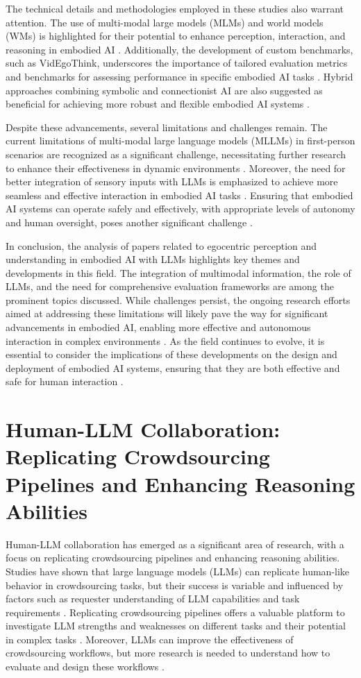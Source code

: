 \documentclass[conference]{IEEEtran}
\begin{document}
The technical details and methodologies employed in these studies also warrant attention. The use of multi-modal large models (MLMs) and world models (WMs) is highlighted for their potential to enhance perception, interaction, and reasoning in embodied AI \cite{b7}. Additionally, the development of custom benchmarks, such as VidEgoThink, underscores the importance of tailored evaluation metrics and benchmarks for assessing performance in specific embodied AI tasks \cite{b3}. Hybrid approaches combining symbolic and connectionist AI are also suggested as beneficial for achieving more robust and flexible embodied AI systems \cite{b8}.

Despite these advancements, several limitations and challenges remain. The current limitations of multi-modal large language models (MLLMs) in first-person scenarios are recognized as a significant challenge, necessitating further research to enhance their effectiveness in dynamic environments \cite{b9}. Moreover, the need for better integration of sensory inputs with LLMs is emphasized to achieve more seamless and effective interaction in embodied AI tasks \cite{b10}. Ensuring that embodied AI systems can operate safely and effectively, with appropriate levels of autonomy and human oversight, poses another significant challenge \cite{b11}.

In conclusion, the analysis of papers related to egocentric perception and understanding in embodied AI with LLMs highlights key themes and developments in this field. The integration of multimodal information, the role of LLMs, and the need for comprehensive evaluation frameworks are among the prominent topics discussed. While challenges persist, the ongoing research efforts aimed at addressing these limitations will likely pave the way for significant advancements in embodied AI, enabling more effective and autonomous interaction in complex environments \cite{b12}. As the field continues to evolve, it is essential to consider the implications of these developments on the design and deployment of embodied AI systems, ensuring that they are both effective and safe for human interaction \cite{b13}.

\section{Human-LLM Collaboration: Replicating Crowdsourcing Pipelines and Enhancing Reasoning Abilities}
Human-LLM collaboration has emerged as a significant area of research, with a focus on replicating crowdsourcing pipelines and enhancing reasoning abilities. Studies have shown that large language models (LLMs) can replicate human-like behavior in crowdsourcing tasks, but their success is variable and influenced by factors such as requester understanding of LLM capabilities and task requirements \cite{b1}. Replicating crowdsourcing pipelines offers a valuable platform to investigate LLM strengths and weaknesses on different tasks and their potential in complex tasks \cite{b1}. Moreover, LLMs can improve the effectiveness of crowdsourcing workflows, but more research is needed to understand how to evaluate and design these workflows \cite{b2}.
\end{document}
